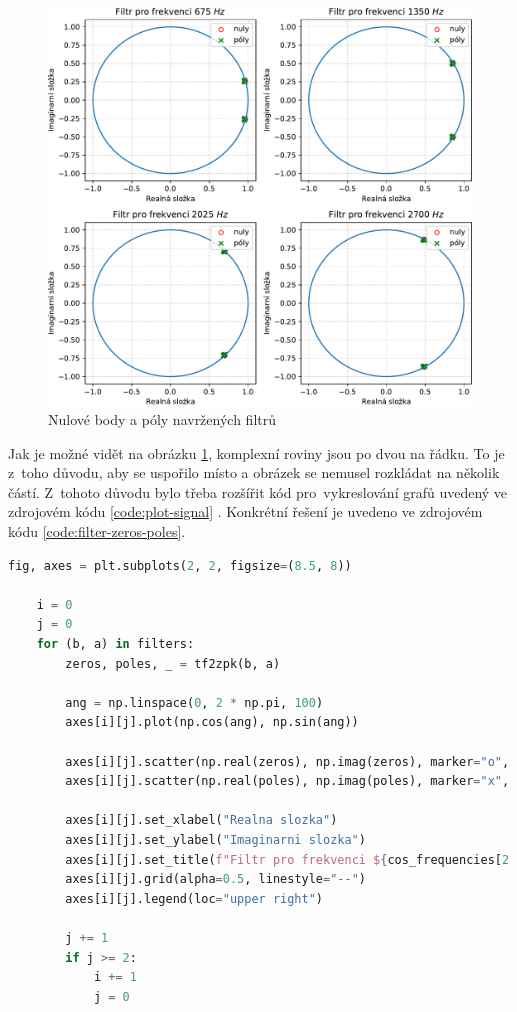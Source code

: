 \documentclass[a4paper, 11pt, final]{article}
\begin{document}
\begin{figure}[ht]
    \centering
    \includegraphics[scale=0.6]{img/08-zeros-poles.pdf}
    \caption{Nulové body a póly navržených filtrů}
    \label{fig:zeros-poles}
\end{figure}

Jak je možné vidět na obrázku \ref{fig:zeros-poles}, komplexní roviny jsou po dvou na řádku. To je z~toho důvodu, aby se uspořilo místo a obrázek se nemusel rozkládat na několik částí. Z~tohoto důvodu bylo třeba rozšířit kód pro~vykreslování grafů uvedený ve zdrojovém kódu \ref{code:plot-signal} \cite{matplotlib-reference}. Konkrétní řešení je uvedeno ve zdrojovém kódu \ref{code:filter-zeros-poles}.

\begin{lstlisting}[language=Python, caption=Výpočet a zobrazení nul a pólů navržených filtrů, label={code:filter-zeros-poles}]
    fig, axes = plt.subplots(2, 2, figsize=(8.5, 8))

    i = 0
    j = 0
    for (b, a) in filters:
        zeros, poles, _ = tf2zpk(b, a)

        ang = np.linspace(0, 2 * np.pi, 100)
        axes[i][j].plot(np.cos(ang), np.sin(ang))

        axes[i][j].scatter(np.real(zeros), np.imag(zeros), marker="o", facecolors="none", edgecolors="r", label="nuly")
        axes[i][j].scatter(np.real(poles), np.imag(poles), marker="x", color="g", label="poly")

        axes[i][j].set_xlabel("Realna slozka")
        axes[i][j].set_ylabel("Imaginarni slozka")
        axes[i][j].set_title(f"Filtr pro frekvenci ${cos_frequencies[2 * i + j]}\\ Hz$")
        axes[i][j].grid(alpha=0.5, linestyle="--")
        axes[i][j].legend(loc="upper right")

        j += 1
        if j >= 2:
            i += 1
            j = 0
\end{lstlisting}
\end{document}
